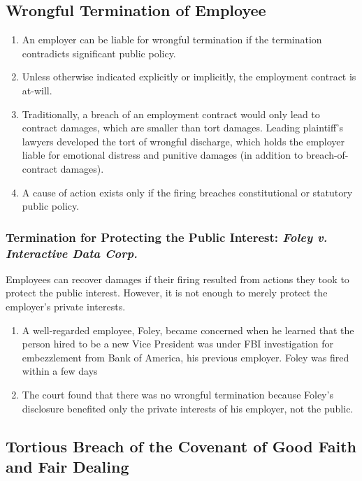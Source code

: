 \subsection{Wrongful Termination of Employee}

\begin{enumerate}
    \item An employer can be liable for wrongful termination if the 
    termination contradicts significant public policy.
    \item Unless otherwise indicated explicitly or implicitly, the employment 
    contract is at-will.
    \item Traditionally, a breach of an employment contract would only lead to 
    contract damages, which are smaller than tort damages. Leading plaintiff's 
    lawyers developed the tort of wrongful discharge, which holds the employer 
    liable for emotional distress and punitive damages (in addition to 
    breach-of-contract damages).
    \item A cause of action exists only if the firing breaches constitutional 
    or statutory public policy.
\end{enumerate}

\subsubsection{Termination for Protecting the Public Interest: \emph{Foley v. 
Interactive Data Corp.}}

Employees can recover damages if their firing resulted from actions they took 
to protect the public interest. However, it is not enough to merely protect 
the employer's private interests.

\begin{enumerate}
    \item A well-regarded employee, Foley, became concerned when he learned 
    that the person hired to be a new Vice President was under FBI 
    investigation for embezzlement from Bank of America, his previous 
    employer. Foley was fired within a few days
    \item The court found that there was no wrongful termination because 
    Foley's disclosure benefited only the private interests of his employer, 
    not the public.
\end{enumerate}

\subsection{Tortious Breach of the Covenant of Good Faith and Fair Dealing}

